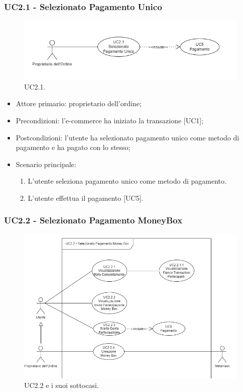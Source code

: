 \subsubsection{UC2.1 - Selezionato Pagamento Unico}\label{sssec: UC2.1}

\begin{figure}[H]
    \centering
    \includegraphics[scale=0.7]{immagini/UseCases-UC2-2.png}
    \caption{UC2.1.}
\end{figure}

\begin{itemize}
    \item Attore primario: proprietario dell'ordine;
    \item Precondizioni: l'e-commerce\glo{} ha iniziato la transazione [UC1];
    \item Postcondizioni: l'utente ha selezionato pagamento unico come metodo di pagamento e ha pagato con lo stesso;
    \item Scenario principale:
          \begin{enumerate}
              \item L'utente seleziona pagamento unico come metodo di pagamento.
              \item L'utente effettua il pagamento [UC5].
          \end{enumerate}
\end{itemize}

\subsubsection{UC2.2 -  Selezionato Pagamento MoneyBox}

\begin{figure}[H]
    \centering
    \includegraphics[scale=0.7]{immagini/UseCases-UC2-3.png}
    \caption{UC2.2 e i suoi sottocasi.}
\end{figure}

